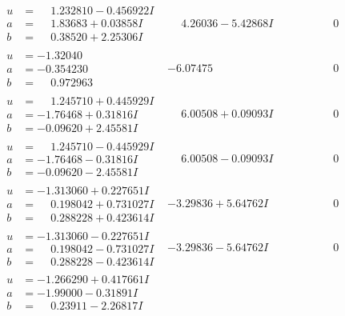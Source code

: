\documentclass[1p]{elsarticle_modified}
\theoremstyle{definition}
\begin{document}
$$\begin{array}{c|c|c}
\begin{aligned}
u &= \phantom{-}1.232810 - 0.456922 I \\
a &= \phantom{-}1.83683 + 0.03858 I \\
b &= \phantom{-}0.38520 + 2.25306 I\end{aligned}
 & \phantom{-}4.26036 - 5.42868 I & \phantom{-0.000000 } 0 \\ \hline\begin{aligned}
u &= -1.32040\phantom{ +0.000000I} \\
a &= -0.354230\phantom{ +0.000000I} \\
b &= \phantom{-}0.972963\phantom{ +0.000000I}\end{aligned}
 & -6.07475\phantom{ +0.000000I} & \phantom{-0.000000 } 0 \\ \hline\begin{aligned}
u &= \phantom{-}1.245710 + 0.445929 I \\
a &= -1.76468 + 0.31816 I \\
b &= -0.09620 + 2.45581 I\end{aligned}
 & \phantom{-}6.00508 + 0.09093 I & \phantom{-0.000000 } 0 \\ \hline\begin{aligned}
u &= \phantom{-}1.245710 - 0.445929 I \\
a &= -1.76468 - 0.31816 I \\
b &= -0.09620 - 2.45581 I\end{aligned}
 & \phantom{-}6.00508 - 0.09093 I & \phantom{-0.000000 } 0 \\ \hline\begin{aligned}
u &= -1.313060 + 0.227651 I \\
a &= \phantom{-}0.198042 + 0.731027 I \\
b &= \phantom{-}0.288228 + 0.423614 I\end{aligned}
 & -3.29836 + 5.64762 I & \phantom{-0.000000 } 0 \\ \hline\begin{aligned}
u &= -1.313060 - 0.227651 I \\
a &= \phantom{-}0.198042 - 0.731027 I \\
b &= \phantom{-}0.288228 - 0.423614 I\end{aligned}
 & -3.29836 - 5.64762 I & \phantom{-0.000000 } 0 \\ \hline\begin{aligned}
u &= -1.266290 + 0.417661 I \\
a &= -1.99000 - 0.31891 I \\
b &= \phantom{-}0.23911 - 2.26817 I\end{aligned}

\end{array}$$
\end{document}
